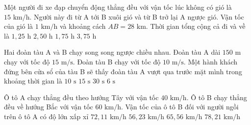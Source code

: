 \begin{ex}
Một người đi xe đạp chuyển động thẳng đều với vận tốc lúc không có gió là $15\text{ km/h}$. Người này đi từ A tới B xuôi gió và từ B trở lại A ngược gió. Vận tốc của gió là $1\text{ km/h}$ và khoảng cách $AB = 28\text{ km}$. Thời gian tổng cộng cả đi và về là
\choice
{$1{,}25\text{ h}$}
{$2{,}50\text{ h}$}
{$1{,}75\text{ h}$}
{\True $3{,}75\text{ h}$}
\end{ex}

\begin{ex}
Hai đoàn tàu A và B chạy song song ngược chiều nhau. Đoàn tàu A dài $150\text{ m}$ chạy với tốc độ $15\text{ m/s}$. Đoàn tàu B chạy với tốc độ $10\text{ m/s}$. Một hành khách đứng bên cửa sổ của tàu B sẽ thấy đoàn tàu A vượt qua trước mặt mình trong khoảng thời gian là
\choice
{$10\text{ s}$}
{$15\text{ s}$}
{$30\text{ s}$}
{\True $6\text{ s}$}
\end{ex}

\begin{ex}
Ô tô A chạy thẳng đều theo hướng Tây với vận tốc $40\text{ km/h}$. Ô tô B chạy thẳng đều về hướng Bắc với vận tốc $60\text{ km/h}$. Vận tốc của ô tô B đối với người ngồi trên ô tô A có độ lớn xấp xỉ
\choice
{\True $72{,}11\text{ km/h}$}
{$56{,}23\text{ km/h}$}
{$65{,}56\text{ km/h}$}
{$78{,}21\text{ km/h}$}
\end{ex}

